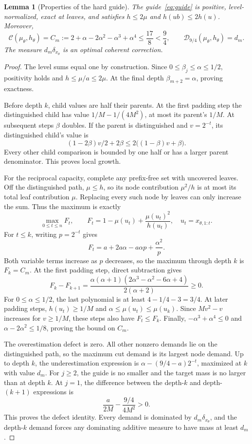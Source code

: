 \documentclass[11pt]{article}
\newtheorem{lemma}[theorem]{Lemma}
\theoremstyle{definition}\newtheorem{definition}[theorem]{Definition}
\theoremstyle{remark}\newtheorem{remark}[theorem]{Remark}
\newcommand{\CC}{\mathcal C}
\newcommand{\DD}{\mathcal D}
\begin{document}
\begin{lemma}[Properties of the hard guide]\label{lem:capacity}
The guide~\eqref{eq:guide} is positive, level-normalized, exact at leaves, and satisfies $h\le2\mu$ and $h(ub)\le2h(u)$. Moreover,
\begin{equation}\label{eq:capacity-value}
 \CC(\mu_\theta,h_\theta)=C_m:=2+\alpha-2\alpha^2-\alpha^3+\alpha^4
 \le\frac{17}{8}<\frac94,
 \qquad \DD_{9/4}(\mu_\theta,h_\theta)=d_m.
\end{equation}
The measure $d_m\delta_{x_\theta}$ is an optimal coherent correction.
\end{lemma}
\begin{proof}
The level sums equal one by construction. Since $0\le\beta_j\le\alpha\le1/2$, positivity holds and $h\le\mu/a\le2\mu$. At the final depth $\beta_{m+2}=\alpha$, proving exactness.

Before depth $k$, child values are half their parents. At the first padding step the distinguished child has value $1/M-1/(4M^2)$, at most its parent's $1/M$. At subsequent steps $\beta$ doubles. If the parent is distinguished and $v=2^{-t}$, its distinguished child's value is
\[
 (1-2\beta)v/2+2\beta\le2\bigl((1-\beta)v+\beta\bigr).
\]
Every other child comparison is bounded by one half or has a larger parent denominator. This proves local growth.

For the reciprocal capacity, complete any prefix-free set with uncovered leaves. Off the distinguished path, $\mu\le h$, so its node contribution $\mu^2/h$ is at most its total leaf contribution $\mu$. Replacing every such node by leaves can only increase the sum. Thus the maximum is exactly
\begin{equation}\label{eq:cut-reduction}
 \max_{0\le t\le n}F_t,\qquad
 F_t=1-\mu(u_t)+\frac{\mu(u_t)^2}{h(u_t)},\quad u_t=x_{\theta,1:t}.
\end{equation}
For $t\le k$, writing $p=2^{-t}$ gives
\[
 F_t=a+2a\alpha-a\alpha p+\frac{\alpha^2}{p}.
\]
Both variable terms increase as $p$ decreases, so the maximum through depth $k$ is $F_k=C_m$. At the first padding step, direct subtraction gives
\[
 F_k-F_{k+1}=
 \frac{\alpha(\alpha+1)(2\alpha^3-\alpha^2-6\alpha+4)}{2(\alpha+2)}\ge0.
\]
For $0\le\alpha\le1/2$, the last polynomial is at least $4-1/4-3=3/4$. At later padding steps, $h(u_t)\ge1/M$ and $\alpha\le\mu(u_t)\le\mu(u_k)$. Since $Mv^2-v$ increases for $v\ge1/M$, these steps also have $F_t\le F_k$. Finally, $-\alpha^3+\alpha^4\le0$ and $\alpha-2\alpha^2\le1/8$, proving the bound on $C_m$.

The overestimation defect is zero. All other nonzero demands lie on the distinguished path, so the maximum cut demand is its largest node demand. Up to depth $k$, the underestimation expression is $\alpha-(9/4-a)2^{-t}$, maximized at $k$ with value $d_m$. For $j\ge2$, the guide is no smaller and the target mass is no larger than at depth $k$. At $j=1$, the difference between the depth-$k$ and depth-$(k+1)$ expressions is
\[
 \frac{a}{2M}-\frac{9/4}{4M^2}>0.
\]
This proves the defect identity. Every demand is dominated by $d_m\delta_{x_\theta}$, and the depth-$k$ demand forces any dominating additive measure to have mass at least $d_m$.
\end{proof}
\end{document}
